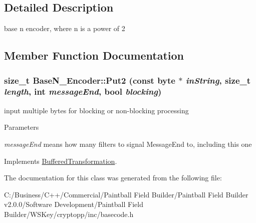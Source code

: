 \subsection{Detailed Description}
base n encoder, where n is a power of 2 

\subsection{Member Function Documentation}
\hypertarget{class_base_n___encoder_adb9ab1b4d48de6c26b04d4691be2f0f0}{
\subsubsection[{Put2}]{\setlength{\rightskip}{0pt plus 5cm}size\_\-t BaseN\_\-Encoder::Put2 (const byte $\ast$ {\em inString}, \/  size\_\-t {\em length}, \/  int {\em messageEnd}, \/  bool {\em blocking})}}
\label{class_base_n___encoder_adb9ab1b4d48de6c26b04d4691be2f0f0}


input multiple bytes for blocking or non-\/blocking processing 
\begin{DoxyParams}{Parameters}
\item[{\em messageEnd}]means how many filters to signal MessageEnd to, including this one \end{DoxyParams}


Implements \hyperlink{class_buffered_transformation_ad396dcb42260f23125a35ec0e5d17d55}{BufferedTransformation}.

The documentation for this class was generated from the following file:\begin{DoxyCompactItemize}
\item 
C:/Business/C++/Commercial/Paintball Field Builder/Paintball Field Builder v2.0.0/Software Development/Paintball Field Builder/WSKey/cryptopp/inc/basecode.h\end{DoxyCompactItemize}
